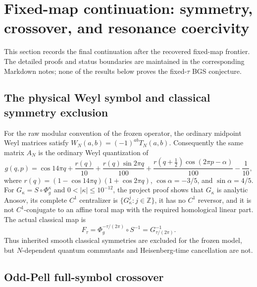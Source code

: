 \section{Fixed-map continuation: symmetry, crossover, and resonance coercivity}
\label{sec:fixed-map-20260921}

This section records the final continuation after the recovered fixed-map
frontier.  The detailed proofs and status boundaries are maintained in the
corresponding Markdown notes; none of the results below proves the
fixed-\(\tau\) BGS conjecture.

\subsection{The physical Weyl symbol and classical symmetry exclusion}

For the raw modular convention of the frozen operator, the ordinary midpoint
Weyl matrices satisfy \(W_N(a,b)=(-1)^{ab}T_N(a,b)\).  Consequently the same
matrix \(A_N\) is the ordinary Weyl quantization of
\[
 g(q,p)=\cos14\pi q+\frac{r(q)}{10}
 +\frac{r(q)\sin2\pi q}{100}
 +\frac{r(q+\frac12)\cos(2\pi p-\alpha)}{100}-\frac1{10},
\]
where \(r(q)=(1-\cos14\pi q)(1+\cos2\pi q)\),
\(\cos\alpha=-3/5\), and \(\sin\alpha=4/5\).
For \(G_\kappa=S\circ\Phi_g^\kappa\) and
\(0<|\kappa|\le10^{-12}\), the project proof shows that \(G_\kappa\) is
analytic Anosov, its complete \(C^1\) centralizer is
\(\{G_\kappa^j:j\in\mathbb Z\}\), it has no \(C^1\) reversor, and it is not
\(C^1\)-conjugate to an affine toral map with the required homological
linear part.  The actual classical map is
\[
 F_\tau=\Phi_g^{-\tau/(2\pi)}\circ S^{-1}
       =G_{\tau/(2\pi)}^{-1}.
\]
Thus inherited smooth classical symmetries are excluded for the frozen model,
but \(N\)-dependent quantum commutants and Heisenberg-time cancellation are
not.

\subsection{Odd-Pell full-symbol crossover}


